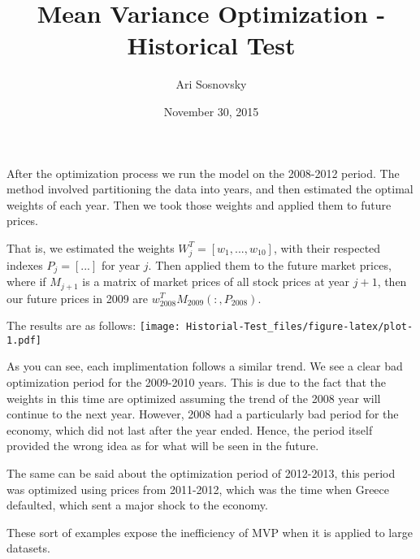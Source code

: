 \documentclass[]{article}
\title{Mean Variance Optimization - Historical Test}
\author{Ari Sosnovsky}
\date{November 30, 2015}
\begin{document}
\maketitle


After the optimization process we run the model on the 2008-2012 period.
The method involved partitioning the data into years, and then estimated
the optimal weights of each year. Then we took those weights and applied
them to future prices.

That is, we estimated the weights \(W^T_j = [w_1,...,w_{10}]\), with
their respected indexes \(P_j = [...]\) for year \(j\). Then applied
them to the future market prices, where if \(M_{j+1}\) is a matrix of
market prices of all stock prices at year \(j+1\), then our future
prices in 2009 are \(w^T_{2008}M_{2009}(:,P_{2008})\).

The results are as follows:
\texttt{[image: Historial-Test\_files/figure-latex/plot-1.pdf]}

As you can see, each implimentation follows a similar trend. We see a
clear bad optimization period for the 2009-2010 years. This is due to
the fact that the weights in this time are optimized assuming the trend
of the 2008 year will continue to the next year. However, 2008 had a
particularly bad period for the economy, which did not last after the
year ended. Hence, the period itself provided the wrong idea as for what
will be seen in the future.

The same can be said about the optimization period of 2012-2013, this
period was optimized using prices from 2011-2012, which was the time
when Greece defaulted, which sent a major shock to the economy.

These sort of examples expose the inefficiency of MVP when it is applied
to large datasets.
\end{document}
